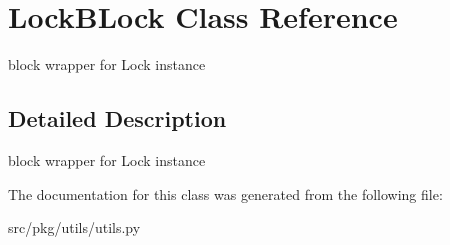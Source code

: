 \hypertarget{class_lock_b_lock}{}\section{Lock\+B\+Lock Class Reference}
\label{class_lock_b_lock}


block wrapper for Lock instance  




\subsection{Detailed Description}
block wrapper for Lock instance 

The documentation for this class was generated from the following file\+:\begin{DoxyCompactItemize}
\item 
src/pkg/utils/utils.\+py\end{DoxyCompactItemize}
